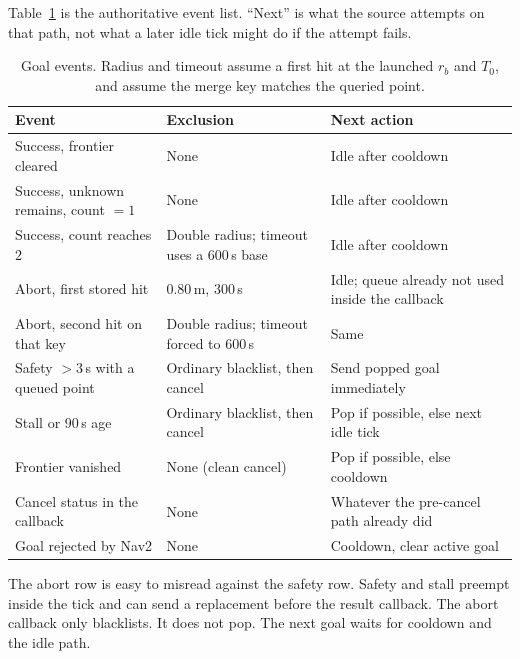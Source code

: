 \documentclass[11pt]{article}
\begin{document}
Table~\ref{tab:events} is the authoritative event list. ``Next'' is what the source attempts on that path, not what a later idle tick might do if the attempt fails.

\begin{table}[ht]
\centering
\caption{Goal events. Radius and timeout assume a first hit at the launched $r_b$ and $T_0$, and assume the merge key matches the queried point.}
\label{tab:events}
\small
\begin{tabular}{@{}p{4.3cm}p{3.3cm}p{6.6cm}@{}}
\toprule
Event & Exclusion & Next action \\
\midrule
Success, frontier cleared & None & Idle after cooldown \\
Success, unknown remains, count $=1$ & None & Idle after cooldown \\
Success, count reaches $2$ & Double radius; timeout uses a 600\,s base & Idle after cooldown \\
Abort, first stored hit & $0.80$\,m, $300$\,s & Idle; queue already not used inside the callback \\
Abort, second hit on that key & Double radius; timeout forced to $600$\,s & Same \\
Safety $>3$\,s with a queued point & Ordinary blacklist, then cancel & Send popped goal immediately \\
Stall or $90$\,s age & Ordinary blacklist, then cancel & Pop if possible, else next idle tick \\
Frontier vanished & None (clean cancel) & Pop if possible, else cooldown \\
Cancel status in the callback & None & Whatever the pre-cancel path already did \\
Goal rejected by Nav2 & None & Cooldown, clear active goal \\
\bottomrule
\end{tabular}
\end{table}

The abort row is easy to misread against the safety row. Safety and stall preempt inside the tick and can send a replacement before the result callback. The abort callback only blacklists. It does not pop. The next goal waits for cooldown and the idle path.
\end{document}
